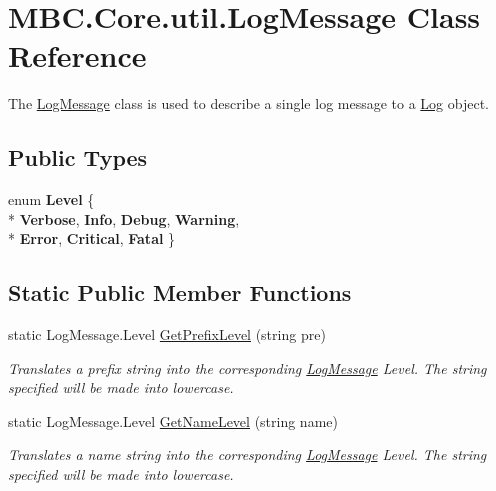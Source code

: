 \hypertarget{class_m_b_c_1_1_core_1_1util_1_1_log_message}{\section{M\-B\-C.\-Core.\-util.\-Log\-Message Class Reference}
\label{class_m_b_c_1_1_core_1_1util_1_1_log_message}
}


The \hyperlink{class_m_b_c_1_1_core_1_1util_1_1_log_message}{Log\-Message} class is used to describe a single log message to a \hyperlink{class_m_b_c_1_1_core_1_1util_1_1_log}{Log} object. 


\subsection*{Public Types}
\begin{DoxyCompactItemize}
\item 
enum {\bfseries Level} \{ \\*
{\bfseries Verbose}, 
{\bfseries Info}, 
{\bfseries Debug}, 
{\bfseries Warning}, 
\\*
{\bfseries Error}, 
{\bfseries Critical}, 
{\bfseries Fatal}
 \}
\end{DoxyCompactItemize}
\subsection*{Static Public Member Functions}
\begin{DoxyCompactItemize}
\item 
\hypertarget{class_m_b_c_1_1_core_1_1util_1_1_log_message_a118fce73f3b41f40305c7e7efc687620}{static Log\-Message.\-Level \hyperlink{class_m_b_c_1_1_core_1_1util_1_1_log_message_a118fce73f3b41f40305c7e7efc687620}{Get\-Prefix\-Level} (string pre)}\label{class_m_b_c_1_1_core_1_1util_1_1_log_message_a118fce73f3b41f40305c7e7efc687620}

\begin{DoxyCompactList}\small\item\em Translates a prefix string into the corresponding \hyperlink{class_m_b_c_1_1_core_1_1util_1_1_log_message}{Log\-Message} Level. The string specified will be made into lowercase.\end{DoxyCompactList}\item 
\hypertarget{class_m_b_c_1_1_core_1_1util_1_1_log_message_a5826ddb8de3dbc2c294d5ea98756c911}{static Log\-Message.\-Level \hyperlink{class_m_b_c_1_1_core_1_1util_1_1_log_message_a5826ddb8de3dbc2c294d5ea98756c911}{Get\-Name\-Level} (string name)}\label{class_m_b_c_1_1_core_1_1util_1_1_log_message_a5826ddb8de3dbc2c294d5ea98756c911}

\begin{DoxyCompactList}\small\item\em Translates a name string into the corresponding \hyperlink{class_m_b_c_1_1_core_1_1util_1_1_log_message}{Log\-Message} Level. The string specified will be made into lowercase.\end{DoxyCompactList}\end{DoxyCompactItemize}


